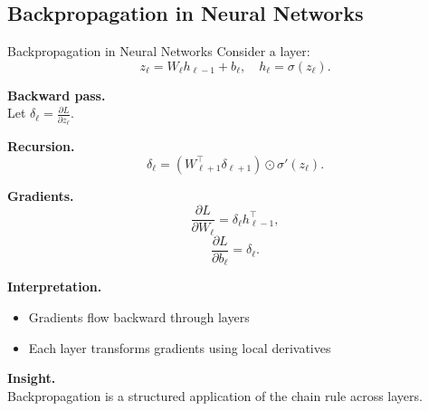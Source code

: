 \documentclass[aspectratio=169,11pt]{beamer}
\begin{document}
\subsection{Backpropagation in Neural Networks}
\begin{frame}[t,allowframebreaks]{Backpropagation in Neural Networks}
\small
Consider a layer:
\[
z_\ell = W_\ell h_{\ell-1} + b_\ell, \quad h_\ell = \sigma(z_\ell).
\]

\textbf{Backward pass.}\\ Let $\delta_\ell = \frac{\partial L}{\partial z_\ell}$.

\textbf{Recursion.}\\ \[
\delta_\ell = (W_{\ell+1}^\top \delta_{\ell+1}) \odot \sigma'(z_\ell).
\]

\textbf{Gradients.}\\ \[
\frac{\partial L}{\partial W_\ell} = \delta_\ell h_{\ell-1}^\top,
\]
\[
\frac{\partial L}{\partial b_\ell} = \delta_\ell.
\]

\textbf{Interpretation.}\\ \begin{itemize}
    \item Gradients flow backward through layers
    \item Each layer transforms gradients using local derivatives
\end{itemize}

\textbf{Insight.}\\ Backpropagation is a structured application of the chain rule across layers.
\end{frame}
\end{document}
